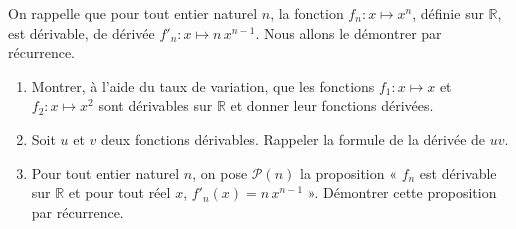 \documentclass[11pt,fleqn]{book} %
\begin{document}
\begin{exercise}
On rappelle que pour tout entier naturel $n$, la fonction $f_n : x \mapsto x^n$, définie sur $\mathbb{R}$, est dérivable, de dérivée $f'_n : x \mapsto n\,x^{n-1}$. Nous allons le démontrer par récurrence.
\begin{enumerate}
\item Montrer, à l'aide du taux de variation, que les fonctions \(f_1 : x \mapsto x\) et \(f_2 : x \mapsto x^2\) sont dérivables sur \( \mathbb{R}\) et donner leur fonctions dérivées.
\item Soit $u$ et $v$ deux fonctions dérivables. Rappeler la formule de la dérivée de $uv$.
\item Pour tout entier naturel $n$, on pose $\mathcal{P}(n)$ la proposition « $f_n$ est dérivable sur $\mathbb{R}$ et pour tout réel $x$, $f'_n(x)=n\,x^{n-1}$ ». Démontrer cette proposition par récurrence.\end{enumerate}
\end{exercise}
\end{document}
